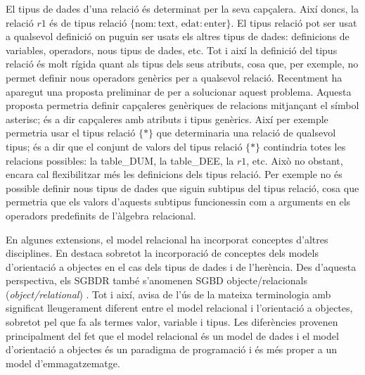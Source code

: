 El tipus de dades d'una relació és determinat per la seva capçalera.
Així doncs, la relació $r1$ és de tipus relació $\{\text{nom}:
\text{text},\, \text{edat}:\text{enter} \}$.  El tipus relació pot ser
usat a qualsevol definició on puguin ser usats els altres tipus de
dades: definicions de variables, operadors, nous tipus de dades,
etc. Tot i així la definició del tipus relació és molt rígida quant
als tipus dels seus atributs, cosa que, per exemple, no permet definir
nous operadors genèrics per a qualsevol relació.  Recentment ha
aparegut una proposta preliminar de
\textcite{darwen13:generic_relation_type} per a solucionar aquest
problema. Aquesta proposta permetria definir capçaleres genèriques de
relacions mitjançant el símbol asterisc; és a dir capçaleres amb
atributs i tipus genèrics. Així per exemple permetria usar el tipus
relació $\{ * \}$ que determinaria una relació de qualsevol tipus; és
a dir que el conjunt de valors del tipus relació $\{ * \}$ contindria
totes les relacions possibles: la table\_DUM, la table\_DEE, la $r1$,
etc. Això no obstant, encara cal flexibilitzar més les definicions
dels tipus relació. Per exemple no és possible definir nous tipus de
dades que siguin subtipus del tipus relació, cosa que permetria que
els valors d'aquests subtipus funcionessin com a arguments en els
operadors predefinits de l'àlgebra relacional.




En algunes extensions, el model relacional ha incorporat conceptes
d'altres disciplines. En destaca sobretot la incorporació de conceptes
dels models d'orientació a objectes en el cas dels tipus de dades i de
l'herència.  Des d'aquesta perspectiva, els SGBDR també s'anomenen
SGBD objecte/relacionals (\emph{object/relational})
\parencite{date02:foundation}.  Tot i així, \textcite[cap.~6]{date06}
avisa de l'ús de la mateixa terminologia amb significat lleugerament
diferent entre el model relacional i l'orientació a objectes, sobretot
pel que fa als termes valor, variable i tipus. %
Les diferències provenen principalment del fet que el model relacional
és un model de dades i el model d'orientació a objectes és un
paradigma de programació i és més proper a un model d'emmagatzematge.







